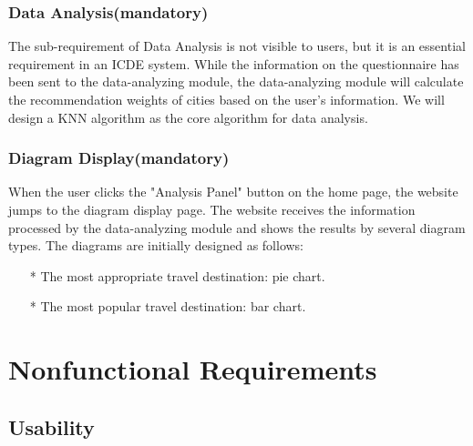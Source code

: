 \documentclass[conference]{IEEEtran}
\begin{document}
\subsubsection{ Data Analysis(mandatory) }

The sub-requirement of Data Analysis is not visible to users, but it is an essential requirement in an ICDE system. While the information on the questionnaire has been sent to
the data-analyzing module, the data-analyzing module will calculate the recommendation weights of cities based on the user's information. We will design a KNN algorithm as the core 
algorithm for data analysis.  


\subsubsection{ Diagram Display(mandatory) }

When the user clicks the "Analysis Panel" button on the home page, the website jumps to the diagram display page.
The website receives the information processed by the data-analyzing module and shows the results by several diagram types. 
The diagrams are initially designed as follows:

\begin{itemize}
\item[*] The most appropriate travel destination: pie chart.

\item[*] The most popular travel destination: bar chart.
\end{itemize}






\section{Nonfunctional Requirements}

\subsection{ Usability }
\end{document}
